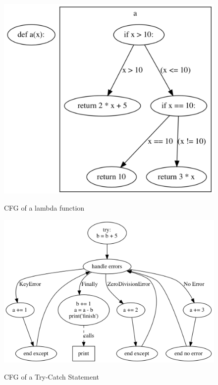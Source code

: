 \documentclass[11pt]{article}
\begin{document}
\begin{figure}[H]
\centering
\begin{minipage}{.53\linewidth}
    \includegraphics[width=\linewidth]{lambda}
    \caption{CFG of a lambda function}
    \label{lambda}
    \vfill
    \includegraphics[width=\linewidth]{try}
    \caption{CFG of a Try-Catch Statement}
    \label{try}
\end{minipage}
\hfill
\begin{minipage}{.43\linewidth}

\end{minipage}
\end{figure}
\end{document}

